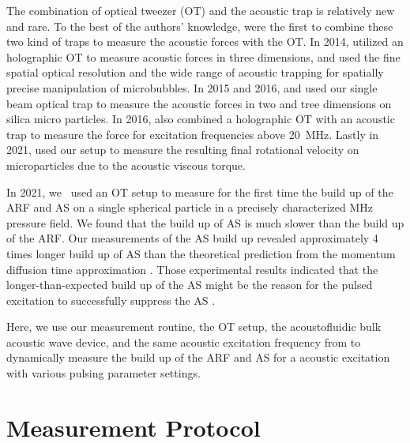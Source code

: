 The combination of optical tweezer (OT) and the acoustic trap is relatively new 
and rare. To the best of the authors' knowledge,  were 
\citeyear{Thalhammer2011} the first to combine these two kind of traps to 
measure the acoustic forces with the OT. In 2014,  
utilized an holographic OT to measure acoustic forces in three dimensions, and 
 used the fine spatial optical resolution and the wide range of 
acoustic trapping for spatially precise manipulation of microbubbles. In 2015 
and 2016,  and  used our single beam 
optical trap to measure the acoustic forces in two and tree dimensions on 
silica micro particles. In 2016,  also combined a 
holographic OT with an acoustic trap to measure the force for excitation 
frequencies above \SI{20}{\mega\hertz}. Lastly in 2021,  
used our setup to measure the resulting final rotational velocity on 
microparticles due to the acoustic viscous torque.

In 2021, we~\cite{Goering2021} used an OT setup to measure for the first time 
the build up of the ARF and AS on a single spherical particle in a precisely 
characterized \si{\mega\hertz} pressure field. We found that the build up of AS 
is much slower than the build up of the ARF. Our measurements of the AS build 
up revealed approximately 4 times longer build up of AS than the theoretical 
prediction from the momentum diffusion time approximation 
\cite{Muller2015,Goering2021}. Those experimental results indicated that the 
longer-than-expected build up of the AS might be the reason for the pulsed 
excitation to successfully suppress the AS \cite{Hoyos2013,Castro2016}.

Here, we use our measurement routine, the OT setup, the acoustofluidic bulk 
acoustic wave device, and the same acoustic excitation frequency from 
\cite{Goering2021} to dynamically measure the build up of the ARF and AS for a 
acoustic excitation with various pulsing parameter settings.


\section{Measurement Protocol}

